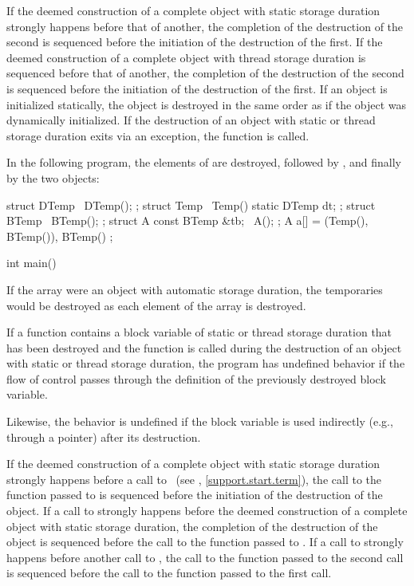 \pnum
If the deemed construction of a complete object with static
storage duration strongly happens before that of another, the completion of the destruction
of the second is sequenced before the initiation of the destruction of the first.
If the deemed construction of a complete object with thread
storage duration is sequenced before that of another, the completion of the destruction
of the second is sequenced before the initiation of the destruction of the first.
If an object is
initialized statically, the object is destroyed in the same order as if
the object was dynamically initialized.
If the destruction of an object with static or thread storage duration
exits via an exception,
the function  is called.
\begin{example}
In the following program,
the elements of  are destroyed,
followed by , and
finally by the two  objects:
\begin{codeblock}
struct DTemp { ~DTemp(); };
struct Temp {
  ~Temp() {
    static DTemp dt;
  }
};
struct BTemp {
  ~BTemp();
};
struct A {
  const BTemp &tb;
  ~A();
};
A a[] = { (Temp(), BTemp()), BTemp() };

int main() {}
\end{codeblock}
If the array  were an object with automatic storage duration,
the  temporaries would be destroyed
as each element of the array is destroyed.
\end{example}

\pnum
If a function contains a block variable of static or thread storage duration that has been
destroyed and the function is called during the destruction of an object with static or
thread storage duration, the program has undefined behavior if the flow of control
passes through the definition of the previously destroyed block variable.
\begin{note}
Likewise, the behavior is undefined
if the block variable is used indirectly (e.g., through a pointer)
after its destruction.
\end{note}

\pnum
{}%
%
If the deemed construction of a complete object with static storage
duration strongly happens before a call to ~(see
, \ref{support.start.term}), the call to the function passed to
 is sequenced before the initiation of the destruction of the object.
If a call to  strongly happens before the deemed construction of
a complete object with static storage duration,
the completion of the destruction of the
object is sequenced before the call to the function passed to . If a
call to  strongly happens before another call to , the
call to the function passed to the second  call is sequenced before
the call to the function passed to the first  call.

